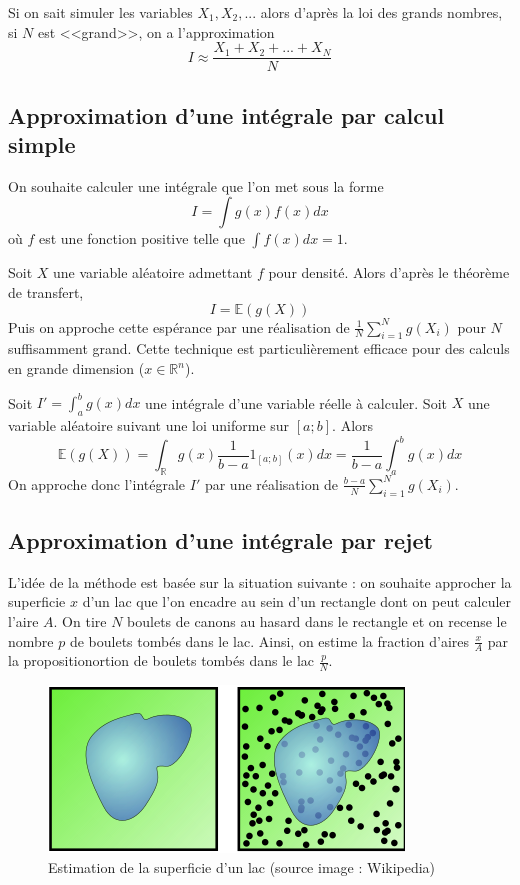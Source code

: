 Si on sait simuler les variables $X_1,X_2,...$ alors d'après la loi des grands nombres, si $N$ est <<grand>>, on a l'approximation 
$$I \approx \frac{X_1+X_2+...+X_N}{N}$$

\subsection{Approximation d'une intégrale par calcul simple}
On souhaite calculer une intégrale que l'on met sous la forme 
$$I=\int g(x)f(x)dx$$
où $f$ est une fonction positive telle que $\int f(x)dx = 1$.

Soit $X$ une variable aléatoire admettant $f$ pour densité. Alors d'après le théorème de transfert, 
$$I = \mathbb{E}(g(X))$$
Puis on approche cette espérance par une réalisation de $\frac{1}{N} \sum\limits_{i=1}^N g(X_i)$ pour $N$ suffisamment grand. Cette technique est particulièrement efficace pour des calculs en grande dimension ($x \in \mathbb{R}^n$). 

Soit $I' = \int_{a}^{b} g(x)dx$ une intégrale d'une variable réelle à calculer. Soit $X$ une variable aléatoire suivant une loi uniforme sur $[a;b]$. Alors 
$$\mathbb{E}(g(X)) = \int_{\mathbb{R}}^{} g(x) \frac{1}{b-a} 1_{[a;b]}(x)dx = \frac{1}{b-a}\int_a^b g(x)dx$$
On approche donc l'intégrale $I'$ par une réalisation de $\frac{b-a}{N} \sum\limits_{i=1}^N g(X_i)$.

\subsection{Approximation d'une intégrale par rejet}
L'idée de la méthode est basée sur la situation suivante : on souhaite approcher la superficie $x$ d'un lac que l'on encadre au sein d'un rectangle dont on peut calculer l'aire $A$. On tire $N$ boulets de canons au hasard dans le rectangle et on recense le nombre $p$ de boulets tombés dans le lac. Ainsi, on estime la fraction d'aires $\frac{x}{A}$ par la propositionortion de boulets tombés dans le lac $\frac{p}{N}$.

\begin{figure}[h]
	\centering
	\includegraphics[width=0.7\linewidth]{lac}
	\caption{Estimation de la superficie d'un lac (source image : Wikipedia)}
	\label{fig:lac}
\end{figure}

